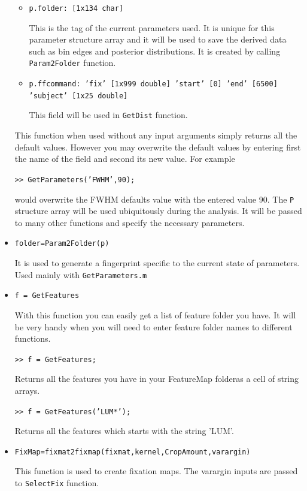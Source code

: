 \documentclass[a4paper,10pt]{report}
\begin{document}
\begin{itemize}
\begin{itemize}
		\item \texttt{p.folder: [1x134 char]} 

		This is the tag of the current parameters used. It is unique for this parameter structure array and it will be used to save the derived data such as bin edges and posterior distributions. It is created by calling \texttt{Param2Folder} function.

     		\item \texttt{p.ffcommand: {'fix'  [1x999 double]  'start'  [0]  'end'  [6500]  'subject'  [1x25 double]}} 

		This field will be used in \texttt{GetDist} function. 

	\end{itemize}

This function when used without any input arguments simply returns all the default values. However you may overwrite the default values by entering first the name of the field and second its new value. For example 
	
	\texttt{>> GetParameters('FWHM',90);}
	
would overwrite the FWHM defaults value with the entered value 90. The \texttt{P} structure array will be used ubiquitously during the analysis. It will be passed to many other functions and specify the necessary parameters.

\item \texttt{folder=Param2Folder(p)}

It is used to generate a fingerprint specific to the current state of parameters. Used mainly with \texttt{GetParameters.m}

\item \texttt{f = GetFeatures}

With this function you can easily get a list of feature folder you have. It will be very handy when you will need to enter feature folder names to different functions.
	
	\texttt{>> f = GetFeatures;}  

	Returns all the features you have in your FeatureMap folderas a cell of string arrays.

	\texttt{>> f = GetFeatures('LUM*');}  

	Returns all the features which starts with the string 'LUM'.

\item \texttt{FixMap=fixmat2fixmap(fixmat,kernel,CropAmount,varargin)}

This function is used to create fixation maps. The varargin inputs are passed to \texttt{SelectFix} function.


\end{itemize}
\end{document}

